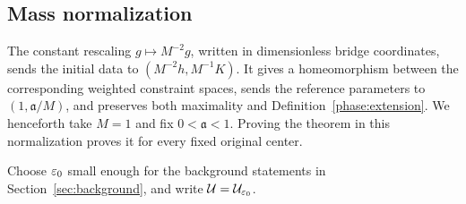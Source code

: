 \subsection{Mass normalization}
\label{phase:scaling}

The constant rescaling \(g\mapsto M^{-2}g\), written in dimensionless
bridge coordinates, sends the initial data to
\((M^{-2}h,M^{-1}K)\). It gives a homeomorphism between the
corresponding weighted constraint spaces, sends the reference
parameters to \((1,\mathfrak a/M)\), and preserves both maximality
and Definition~\ref{phase:extension}. We henceforth take \(M=1\)
and fix \(0<\mathfrak a<1\). Proving the theorem in this normalization
proves it for every fixed original center.

Choose \(\varepsilon_0\) small enough for the background statements in
Section~\ref{sec:background}, and write
\(\mathcal U=\mathcal U_{\varepsilon_0}\).
